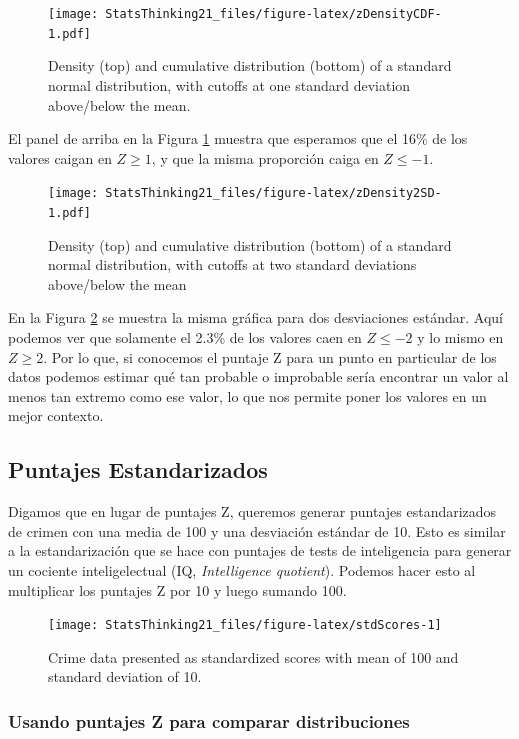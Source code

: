\documentclass[
  12pt,
]{book}
\begin{document}
\begin{figure}
\centering
\texttt{[image: StatsThinking21\_files/figure-latex/zDensityCDF-1.pdf]}
\caption{\label{fig:zDensityCDF}Density (top) and cumulative distribution (bottom) of a standard normal distribution, with cutoffs at one standard deviation above/below the mean.}
\end{figure}

El panel de arriba en la Figura \ref{fig:zDensityCDF} muestra que esperamos que el 16\% de los valores caigan en \(Z\ge 1\), y que la misma proporción caiga en \(Z\le -1\).

\begin{figure}
\centering
\texttt{[image: StatsThinking21\_files/figure-latex/zDensity2SD-1.pdf]}
\caption{\label{fig:zDensity2SD}Density (top) and cumulative distribution (bottom) of a standard normal distribution, with cutoffs at two standard deviations above/below the mean}
\end{figure}

En la Figura \ref{fig:zDensity2SD} se muestra la misma gráfica para dos desviaciones estándar. Aquí podemos ver que solamente el 2.3\% de los valores caen en \(Z \le -2\) y lo mismo en \(Z \ge 2\). Por lo que, si conocemos el puntaje Z para un punto en particular de los datos podemos estimar qué tan probable o improbable sería encontrar un valor al menos tan extremo como ese valor, lo que nos permite poner los valores en un mejor contexto.

\hypertarget{puntajes-estandarizados}{%
\subsection{Puntajes Estandarizados}\label{puntajes-estandarizados}}

Digamos que en lugar de puntajes Z, queremos generar puntajes estandarizados de crimen con una media de 100 y una desviación estándar de 10. Esto es similar a la estandarización que se hace con puntajes de tests de inteligencia para generar un cociente inteligelectual (IQ, \emph{Intelligence quotient}). Podemos hacer esto al multiplicar los puntajes Z por 10 y luego sumando 100.

\begin{figure}
\texttt{[image: StatsThinking21\_files/figure-latex/stdScores-1]} \caption{Crime data presented as standardized scores with mean of  100 and standard deviation of 10.}\label{fig:stdScores}
\end{figure}

\hypertarget{usando-puntajes-z-para-comparar-distribuciones}{%
\subsubsection{Usando puntajes Z para comparar distribuciones}\label{usando-puntajes-z-para-comparar-distribuciones}}
\end{document}
